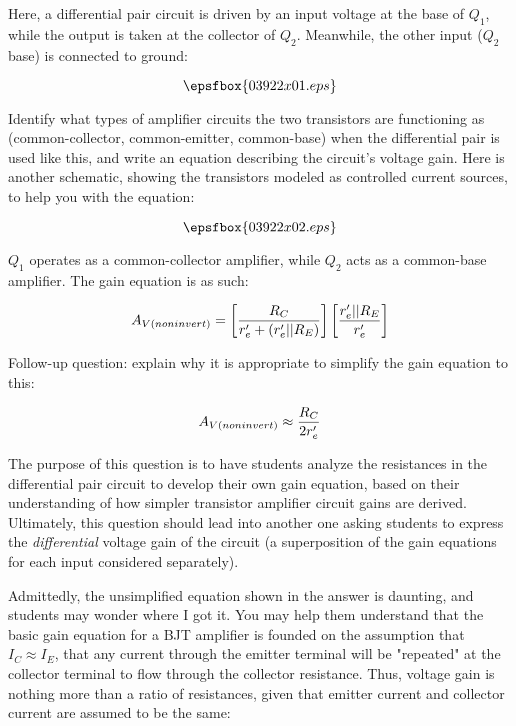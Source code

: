 

Here, a differential pair circuit is driven by an input voltage at the base of $Q_1$, while the output is taken at the collector of $Q_2$.  Meanwhile, the other input ($Q_2$ base) is connected to ground:

$$\epsfbox{03922x01.eps}$$

Identify what types of amplifier circuits the two transistors are functioning as (common-collector, common-emitter, common-base) when the differential pair is used like this, and write an equation describing the circuit's voltage gain.  Here is another schematic, showing the transistors modeled as controlled current sources, to help you with the equation:

$$\epsfbox{03922x02.eps}$$







$Q_1$ operates as a common-collector amplifier, while $Q_2$ acts as a common-base amplifier.  The gain equation is as such:

$$A_{V(noninvert)} = \left[{R_C \over {r'_e + (r'_e || R_E)}}\right] \left[{{r'_e || R_E} \over r'_e} \right]$$

\vskip 10pt

Follow-up question: explain why it is appropriate to simplify the gain equation to this:

$$A_{V(noninvert)} \approx {R_C \over 2r'_e}$$







The purpose of this question is to have students analyze the resistances in the differential pair circuit to develop their own gain equation, based on their understanding of how simpler transistor amplifier circuit gains are derived.  Ultimately, this question should lead into another one asking students to express the {\it differential} voltage gain of the circuit (a superposition of the gain equations for each input considered separately).

Admittedly, the unsimplified equation shown in the answer is daunting, and students may wonder where I got it.  You may help them understand that the basic gain equation for a BJT amplifier is founded on the assumption that $I_C \approx I_E$, that any current through the emitter terminal will be "repeated" at the collector terminal to flow through the collector resistance.  Thus, voltage gain is nothing more than a ratio of resistances, given that emitter current and collector current are assumed to be the same:

